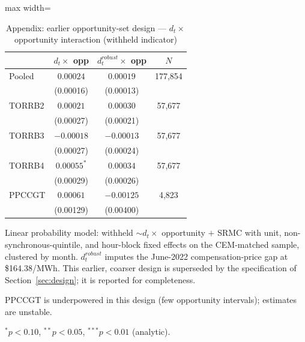 \begin{table}[!htbp]\centering
\caption{Appendix: earlier opportunity-set design --- $d_t \times$ opportunity interaction (withheld indicator)}
\label{tab:withhold_opp}
\begin{adjustbox}{max width=\textwidth}
\begin{threeparttable}
\begin{tabular}{lccc}
\toprule
 & $d_t \times$ opp & $d_t^{robust} \times$ opp & $N$ \\
\midrule
Pooled & $0.00024$ & $0.00019$ & 177,854 \\
 & (0.00016) & (0.00013) & \\
TORRB2 & $0.00021$ & $0.00030$ & 57,677 \\
 & (0.00027) & (0.00021) & \\
TORRB3 & $-0.00018$ & $-0.00013$ & 57,677 \\
 & (0.00027) & (0.00024) & \\
TORRB4 & $0.00055^{*}$ & $0.00034$ & 57,677 \\
 & (0.00029) & (0.00026) & \\
PPCCGT\tnote{a} & $0.00061$ & $-0.00125$ & 4,823 \\
 & (0.00129) & (0.00400) & \\
\bottomrule
\end{tabular}
\begin{tablenotes}\footnotesize
\item Linear probability model: withheld $\sim d_t \times$ opportunity $+$ SRMC with unit, non-synchronous-quintile, and hour-block fixed effects on the CEM-matched sample, clustered by month. $d_t^{robust}$ imputes the June-2022 compensation-price gap at \$164.38/MWh. This earlier, coarser design is superseded by the specification of Section~\ref{sec:design}; it is reported for completeness.
\item[a] PPCCGT is underpowered in this design (few opportunity intervals); estimates are unstable.
\item $^{*}p<0.10$, $^{**}p<0.05$, $^{***}p<0.01$ (analytic).
\end{tablenotes}
\end{threeparttable}
\end{adjustbox}
\end{table}
